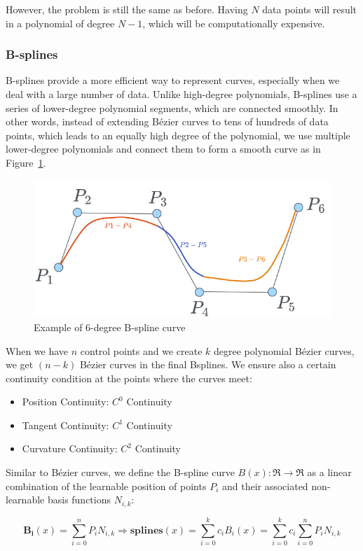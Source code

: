 \documentclass[12pt,a4paper]{article}
\begin{document}
However, the problem is still the same as before. Having $N$ data points will result in a polynomial of degree $N-1$, which will be computationally expensive.

\subsubsection{B-splines}
B-splines provide a more efficient way to represent curves, especially when we deal with a large number of data. Unlike high-degree polynomials, B-splines use a series of lower-degree polynomial segments, which are connected smoothly.
In other words, instead of extending Bézier curves to tens of hundreds of data points, which leads to an equally high degree of the polynomial, we use multiple lower-degree polynomials and connect them to form a smooth curve as in Figure~\ref{fig:bezier4}.

\begin{figure}[H]
    \centering
    \includegraphics[width=0.5\linewidth]{Images/bezier4.png}
    \caption{Example of 6-degree B-spline curve}
    \label{fig:bezier4}
\end{figure}

When we have $n$ control points and we create $k$ degree polynomial Bézier curves, we get $(n-k)$ Bézier curves in the final Bsplines. We ensure also a certain continuity condition at the points where the curves meet:
\begin{itemize}
    \item Position Continuity: $C^0$ Continuity 
    \item Tangent Continuity: $C^1$ Continuity  
    \item Curvature Continuity: $C^2$ Continuity 
\end{itemize}

Similar to Bézier curves, we define the B-spline curve \( B(x): \Re \to \Re \) as a linear combination of the learnable position of points \( P_i \) and their associated non-learnable basis functions \( N_{i,k} \):


\[
\mathbf{B_i}(x) = \sum_{i=0}^n P_i N_{i,k} \Rightarrow \textbf{splines}(x ) = \sum_{i=0}^k c_i B_{i}(x) = \sum_{i=0}^k c_i \sum_{i=0}^n P_i N_{i,k}
\]
\end{document}
